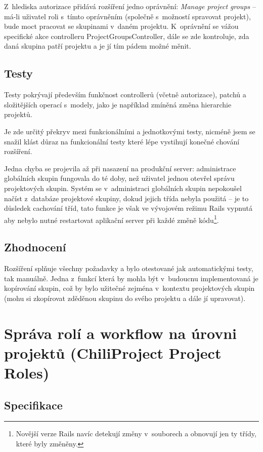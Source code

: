 \documentclass[thesis=B,czech]{FITthesis}[2012/05/02]
\begin{document}
Z~hlediska autorizace přidává rozšíření jedno oprávnění: \emph{Manage
project groups} -- má-li uživatel roli s~tímto oprávněním (společně
s~možností spravovat projekt), bude moct pracovat se skupinami v~daném
projektu. K~oprávnění se vážou specifické akce controlleru
ProjectGroupsController, dále se zde kontroluje, zda daná skupina patří
projektu a je jí tím pádem možné měnit.

\subsection{Testy}

Testy pokrývají především funkčnost controllerů (včetně autorizace),
patchů a složitějších operací s~modely, jako je například zmíněná změna
hierarchie projektů.

Je zde určitý překryv mezi funkcionálními a jednotkovými testy, nicméně
jsem se snažil klást důraz na funkcionální testy které lépe vystihují
konečné chování rozšíření.

Jedna chyba se projevila až při nasazení na produkční server:
administrace globálních skupin fungovala do té doby, než uživatel jednou
otevřel správu projektových skupin. Systém se v~administraci globálních
skupin nepokoušel načíst z~databáze projektové skupiny, dokud jejich
třída nebyla použitá -- je to důsledek cachování tříd, tato funkce je
však ve vývojovém režimu Rails vypnutá aby nebylo nutné restartovat
aplikační server při každé změně kódu\footnote{Novější verze Rails navíc
  detekují změny v~souborech a obnovují jen ty třídy, které byly
  změněny.}.

\subsection{Zhodnocení}

Rozšíření splňuje všechny požadavky a bylo otestované jak automatickými
testy, tak manuálně. Jedna z~funkcí která by mohla být v~budoucnu
implementovaná je kopírování skupin, což by bylo užitečné zejména
v~kontextu projektových skupin (mohu si zkopírovat zděděnou skupinu do
svého projektu a dále jí upravovat).

\section[Správa rolí a workflow na úrovni projektů]{Správa rolí a workflow na úrovni projektů (ChiliProject Project
Roles)}
\label{sec:project_roles}

\subsection{Specifikace}
\end{document}
